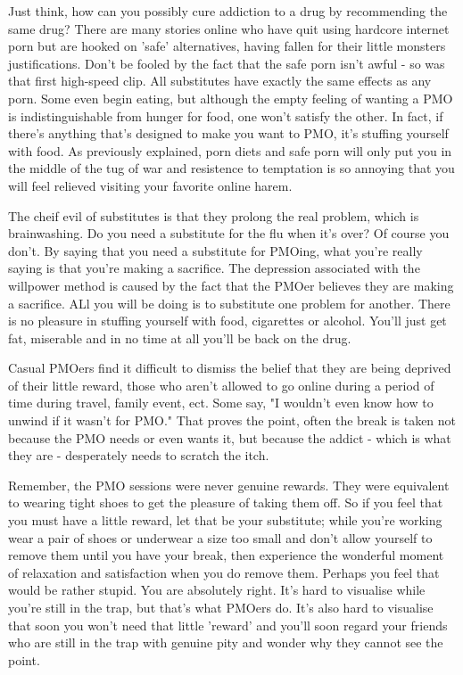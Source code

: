 Just think, how can you possibly cure addiction to a drug by recommending the same drug? There are many stories online who have quit using hardcore internet porn but are hooked on 'safe' alternatives, having fallen for their little monsters justifications. Don't be fooled by the fact that the safe porn isn't awful - so was that first high-speed clip. All substitutes have exactly the same effects as any porn. Some even begin eating, but although the empty feeling of wanting a PMO is indistinguishable from hunger for food, one won't satisfy the other. In fact, if there's anything that's designed to make you want to PMO, it's stuffing yourself with food. As previously explained, porn diets and safe porn will only put you in the middle of the tug of war and resistence to temptation is so annoying that you will feel relieved visiting your favorite online harem.

The cheif evil of substitutes is that they prolong the real problem, which is brainwashing. Do you need a substitute for the flu when it's over? Of course you don't. By saying that you need a substitute for PMOing, what you're really saying is that you're making a sacrifice. The depression associated with the willpower method is caused by the fact that the PMOer believes they are making a sacrifice. ALl you will be doing is to substitute one problem for another. There is no pleasure in stuffing yourself with food, cigarettes or alcohol. You'll just get fat, miserable and in no time at all you'll be back on the drug.

Casual PMOers find it difficult to dismiss the belief that they are being deprived of their little reward, those who aren't allowed to go online during a period of time during travel, family event, ect. Some say, "I wouldn't even know how to unwind if it wasn't for PMO." That proves the point, often the break is taken not because the PMO needs or even wants it, but because the addict - which is what they are - desperately needs to scratch the itch.

Remember, the PMO sessions were never genuine rewards. They were equivalent to wearing tight shoes to get the pleasure of taking them off. So if you feel that you must have a little reward, let that be your substitute; while you're working wear a pair of shoes or underwear a size too small and don't allow yourself to remove them until you have your break, then experience the wonderful moment of relaxation and satisfaction when you do remove them. Perhaps you feel that would be rather stupid. You are absolutely right. It's hard to visualise while you're still in the trap, but that's what PMOers do. It's also hard to visualise that soon you won't need that little 'reward' and you'll soon regard your friends who are still in the trap with genuine pity and wonder why they cannot see the point.

